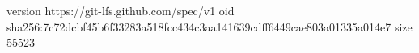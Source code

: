 version https://git-lfs.github.com/spec/v1
oid sha256:7c72dcbf45b6f33283a518fcc434c3aa141639cdff6449cae803a01335a014e7
size 55523
